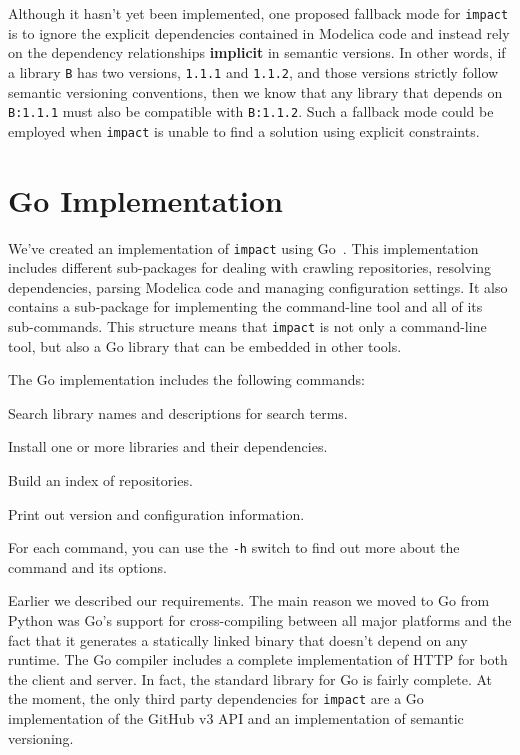 \documentclass[11pt,a4paper,twocolumn]{article}
\newcommand{\code}[1]{\texttt{#1}} %
\begin{document}
Although it hasn't yet been implemented, one proposed fallback mode
for \code{impact} is to ignore the explicit dependencies contained in
Modelica code and instead rely on the dependency relationships {\bf
  implicit} in semantic versions.  In other words, if a library
\code{B} has two versions, \code{1.1.1} and \code{1.1.2}, and those
versions strictly follow semantic versioning conventions, then we know
that any library that depends on \code{B:1.1.1} must also be
compatible with \code{B:1.1.2}.  Such a fallback mode could be
employed when \code{impact} is unable to find a solution using
explicit constraints.

\section{Go Implementation}

We've created an implementation of \code{impact} using Go~\parencite{go-lang}.
This implementation includes different sub-packages for dealing with
crawling repositories, resolving dependencies, parsing Modelica code
and managing configuration settings.  It also contains a sub-package
for implementing the command-line tool and all of its sub-commands.
This structure means that \code{impact} is not only a command-line
tool, but also a Go library that can be embedded in other tools.

The Go implementation includes the following commands:
\begin{description}[noitemsep]
  \item[\code{search}] Search library names and descriptions for
    search terms.
  \item[\code{install}] Install one or more libraries and their
    dependencies.
  \item[\code{index}] Build an index of repositories.
  \item[\code{version}] Print out version and configuration
    information.
\end{description}

For each command, you can use the \code{-h} switch to find out more
about the command and its options.

Earlier we described our requirements.  The main reason we moved to Go
from Python was Go's support for cross-compiling between all major
platforms and the fact that it generates a statically linked binary
that doesn't depend on any runtime.  The Go compiler includes a
complete implementation of HTTP for both the client and server.  In
fact, the standard library for Go is fairly complete.  At the moment,
the only third party dependencies for \code{impact} are a Go
implementation of the GitHub v3 API and an implementation of semantic
versioning.
\end{document}
